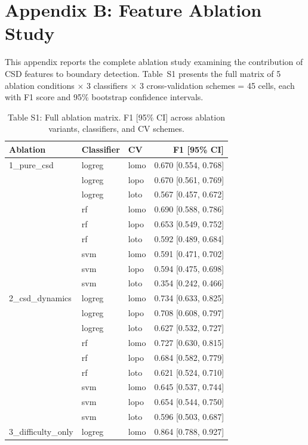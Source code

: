 \documentclass[11pt]{article}
\begin{document}
\clearpage


\section{Appendix B: Feature Ablation Study}
\label{app:ablation}

This appendix reports the complete ablation study examining
the contribution of CSD features to boundary detection.
Table~S1 presents the full matrix of 5 ablation conditions
$\times$ 3 classifiers $\times$ 3 cross-validation schemes = 45 cells,
each with F1 score and 95\% bootstrap confidence intervals.

\begin{table}[h]\centering\small
\caption{Table S1: Full ablation matrix. F1 [95\% CI] across ablation variants, classifiers, and CV schemes.}
\label{tab:ablation}
\begin{tabular}{l|l|l|r}
\toprule
Ablation & Classifier & CV & F1 [95\% CI] \\
\midrule
1\_pure\_csd & logreg & lomo & 0.670 [0.554, 0.768] \\
 & logreg & lopo & 0.670 [0.561, 0.769] \\
 & logreg & loto & 0.567 [0.457, 0.672] \\
 & rf & lomo & 0.690 [0.588, 0.786] \\
 & rf & lopo & 0.653 [0.549, 0.752] \\
 & rf & loto & 0.592 [0.489, 0.684] \\
 & svm & lomo & 0.591 [0.471, 0.702] \\
 & svm & lopo & 0.594 [0.475, 0.698] \\
 & svm & loto & 0.354 [0.242, 0.466] \\
\midrule
2\_csd\_dynamics & logreg & lomo & 0.734 [0.633, 0.825] \\
 & logreg & lopo & 0.708 [0.608, 0.797] \\
 & logreg & loto & 0.627 [0.532, 0.727] \\
 & rf & lomo & 0.727 [0.630, 0.815] \\
 & rf & lopo & 0.684 [0.582, 0.779] \\
 & rf & loto & 0.621 [0.524, 0.710] \\
 & svm & lomo & 0.645 [0.537, 0.744] \\
 & svm & lopo & 0.654 [0.544, 0.750] \\
 & svm & loto & 0.596 [0.503, 0.687] \\
\midrule
3\_difficulty\_only & logreg & lomo & 0.864 [0.788, 0.927] \\

\end{tabular}
\end{table}
\end{document}
